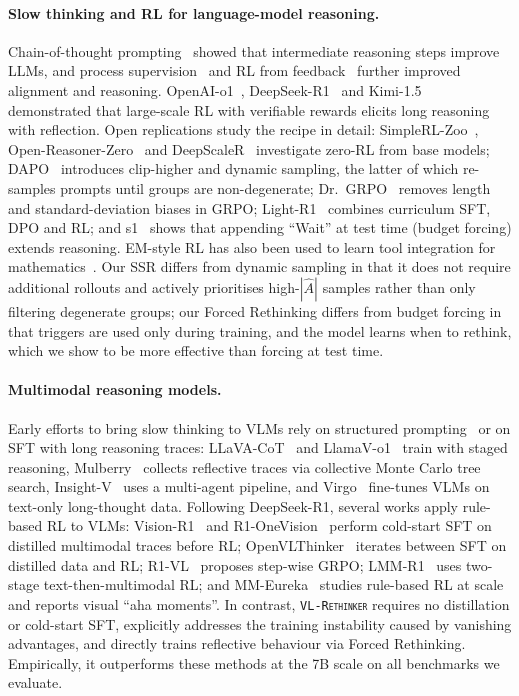 \documentclass{article}
\newcommand{\model}{\texttt{\textsc{VL-Rethinker}}\xspace}
\begin{document}
\paragraph{Slow thinking and RL for language-model reasoning.} Chain-of-thought prompting~\citep{wei2022chain,feng2023towards} showed that intermediate reasoning steps improve LLMs, and process supervision~\citep{letsverify} and RL from feedback~\citep{instructgpt,DPO} further improved alignment and reasoning. OpenAI-o1~\citep{openai-o1}, DeepSeek-R1~\citep{deepseek-r1} and Kimi-1.5~\citep{kimi-1_5} demonstrated that large-scale RL with verifiable rewards elicits long reasoning with reflection. Open replications study the recipe in detail: SimpleRL-Zoo~\citep{simplerl}, Open-Reasoner-Zero~\citep{open-reasoner-zero} and DeepScaleR~\citep{deepscaler2025} investigate zero-RL from base models; DAPO~\citep{dapo} introduces clip-higher and dynamic sampling, the latter of which re-samples prompts until groups are non-degenerate; Dr.~GRPO~\citep{drgrpo} removes length and standard-deviation biases in GRPO; Light-R1~\citep{lightr1} combines curriculum SFT, DPO and RL; and s1~\citep{s1} shows that appending ``Wait'' at test time (budget forcing) extends reasoning. EM-style RL has also been used to learn tool integration for mathematics~\citep{wang2025learning}. Our SSR differs from dynamic sampling in that it does not require additional rollouts and actively prioritises high-$|\hat{A}|$ samples rather than only filtering degenerate groups; our Forced Rethinking differs from budget forcing in that triggers are used only during training, and the model learns when to rethink, which we show to be more effective than forcing at test time.

\paragraph{Multimodal reasoning models.} Early efforts to bring slow thinking to VLMs rely on structured prompting~\citep{mitra2024compositionalchainofthoughtpromptinglarge,luan2024textcotzoomenhancedmultimodal} or on SFT with long reasoning traces: LLaVA-CoT~\citep{llavacot,xu2024llava} and LlamaV-o1~\citep{llamav_o1} train with staged reasoning, Mulberry~\citep{Mulberry} collects reflective traces via collective Monte Carlo tree search, Insight-V~\citep{insight_v} uses a multi-agent pipeline, and Virgo~\citep{virgo} fine-tunes VLMs on text-only long-thought data. Following DeepSeek-R1, several works apply rule-based RL to VLMs: Vision-R1~\citep{vision-r1} and R1-OneVision~\citep{R1OneVision} perform cold-start SFT on distilled multimodal traces before RL; OpenVLThinker~\citep{OpenVLThinker} iterates between SFT on distilled data and RL; R1-VL~\citep{r1vl} proposes step-wise GRPO; LMM-R1~\citep{lmm-r1} uses two-stage text-then-multimodal RL; and MM-Eureka~\citep{mmeureka} studies rule-based RL at scale and reports visual ``aha moments''. In contrast, \model requires no distillation or cold-start SFT, explicitly addresses the training instability caused by vanishing advantages, and directly trains reflective behaviour via Forced Rethinking. Empirically, it outperforms these methods at the 7B scale on all benchmarks we evaluate.
\end{document}
